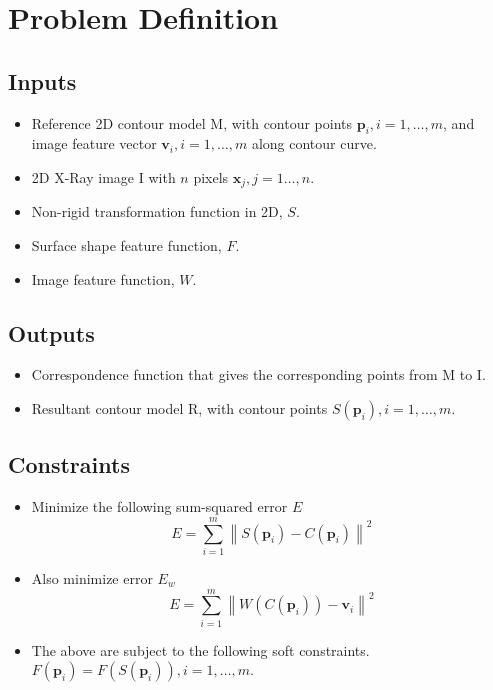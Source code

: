 \documentclass[12pt,a4paper]{article}
\begin{document}
\section{Problem Definition}

\subsection{Inputs}

\begin{itemize}
    \item Reference 2D contour model M, with contour points $\textbf{p}_i, i=1,\dots,m$, and image feature vector $\textbf{v}_i,i=1,\dots,m$ along contour curve.
    \item 2D X-Ray image I with $n$ pixels $\textbf{x}_j,j=1\dots,n$.
    \item Non-rigid transformation function in 2D, $S$.
    \item Surface shape feature function, $F$.
    \item Image feature function, $W$.
\end{itemize}


\subsection{Outputs}

\begin{itemize}
    \item Correspondence function that gives the corresponding points from M to I.
    \item Resultant contour model R, with contour points $S(\textbf{p}_i), i=1,\dots,m$.
\end{itemize}

\subsection{Constraints}

\begin{itemize}
    \item Minimize the following sum-squared error $E$
    \[
    E = \sum _ { i = 1 } ^ { m } \left\| S \left( \mathbf { p } _ { i } \right) - C \left( \mathbf { p } _ { i } \right) \right\| ^ { 2 }
    \]
    \item Also minimize error $E_w$
    \[
        E = \sum _ { i = 1 } ^ { m } \left\| W(C \left( \mathbf { p } _ { i } \right)) - \mathbf { v } _ { i } \right\| ^ { 2 }
    \]
    
    \item The above are subject to the following soft constraints.
    \subitem $F(\textbf{p}_i) = F(S(\textbf{p}_i)), i=1,\dots,m$.
\end{itemize}
\end{document}

